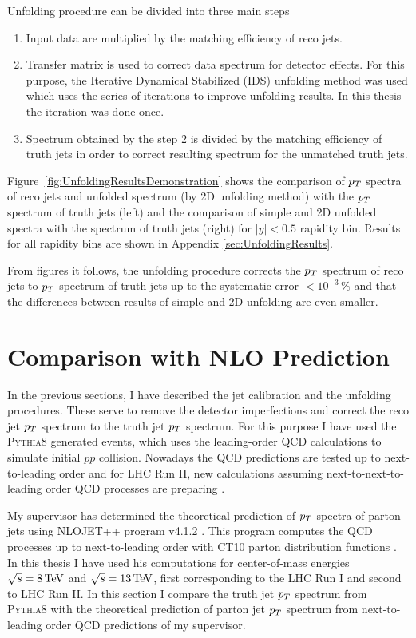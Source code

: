 Unfolding procedure can be divided into three main steps

\begin{enumerate}
  \item Input data are multiplied by the matching efficiency of reco jets.
  \item Transfer matrix is used to correct data spectrum for detector effects.
    For this purpose, the Iterative Dynamical Stabilized (IDS)
    \cite{IterativeDynamicallyStabilized} unfolding method was used which uses
    the series of iterations to improve unfolding results. In this thesis the
    iteration was done once.
  \item Spectrum obtained by the step 2 is divided by the matching efficiency of
    truth jets in order to correct resulting spectrum for the unmatched truth
    jets.
\end{enumerate}

Figure~\ref{fig:UnfoldingResultsDemonstration} shows the comparison of $p_{T}$
spectra of reco jets and unfolded spectrum (by 2D unfolding method) with the
$p_{T}$ spectrum of truth jets (left) and the comparison of simple and 2D unfolded
spectra with the spectrum of truth jets (right) for $|y|<0.5$ rapidity bin.
Results for all rapidity bins are shown in Appendix \ref{sec:UnfoldingResults}.

From figures it follows, the unfolding procedure corrects the
$p_{T}$ spectrum of reco jets to $p_{T}$ spectrum of truth jets up to the systematic
error $<10^{-3}\,\%$ and that the differences between results of simple and 2D
unfolding are even smaller.

\section{Comparison with NLO Prediction}
\label{sec:ComaprisonWithNLOPrediction}

In the previous sections, I have described the jet calibration and the unfolding
procedures. These serve to remove the detector imperfections and correct the
reco jet $p_{T}$ spectrum to the truth jet $p_{T}$ spectrum. For this purpose I
have used the \textsc{Pythia8} generated events, which uses
the leading-order QCD calculations to simulate initial $pp$ collision.
Nowadays the QCD predictions are tested up to next-to-leading order and for
LHC Run II, new calculations assuming next-to-next-to-leading order QCD
processes are preparing \cite{NNLO1,NNLO2}.

My supervisor has determined the theoretical prediction of $p_{T}$ spectra of
parton jets using \textsc{NLOJET++} program v4.1.2 \cite{NLOJetProgram}. This
program computes the QCD processes up to next-to-leading order with CT10
parton distribution functions \cite{CT10PDF, Annecy}. In this thesis I have used
his computations for center-of-mass energies $\sqrt{s}=8\,\text{TeV}$ and
$\sqrt{s}=13\,\text{TeV}$, first corresponding to the LHC Run I and second to LHC Run
II. In this section I compare the truth jet $p_{T}$ spectrum from \textsc{Pythia8}
with the theoretical prediction of parton jet $p_{T}$ spectrum from
next-to-leading order QCD predictions of my supervisor.

